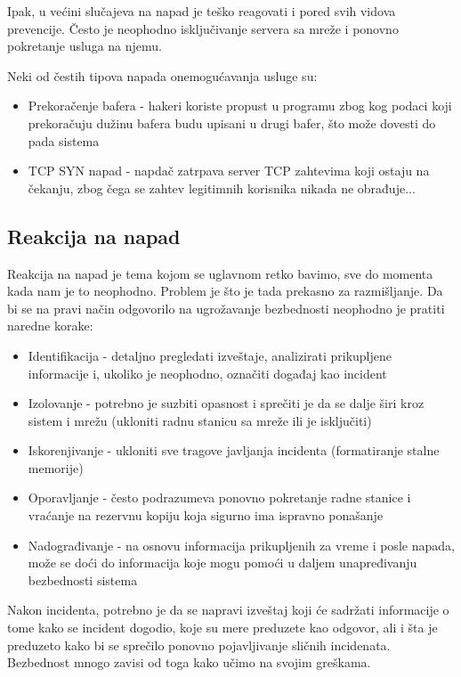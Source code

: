\documentclass[a4paper]{article}
\begin{document}
Ipak, u većini slučajeva na napad je teško reagovati i pored svih vidova prevencije. Često je neophodno isključivanje servera sa mreže i ponovno pokretanje usluga na njemu.

Neki od čestih tipova napada onemogućavanja usluge \cite{DoS} su: 
\begin{itemize}
	\item Prekoračenje bafera - hakeri koriste propust u programu zbog kog podaci koji prekoračuju dužinu bafera budu upisani u drugi bafer, što može dovesti do pada sistema
	\item TCP SYN napad - napdač zatrpava server TCP zahtevima koji ostaju na čekanju, zbog čega se zahtev legitimnih korisnika nikada ne obrađuje...
\end{itemize}

\subsection{Reakcija na napad}

Reakcija na napad \cite{RESP} je tema kojom se uglavnom retko bavimo, sve do momenta kada nam je to neophodno. Problem je što je tada prekasno za razmišljanje. Da bi se na pravi način odgovorilo na ugrožavanje bezbednosti neophodno je pratiti naredne korake:

\begin{itemize}
	\item Identifikacija - detaljno pregledati izveštaje, analizirati prikupljene informacije i, ukoliko je neophodno, označiti događaj kao incident
	\item Izolovanje - potrebno je suzbiti opasnost i sprečiti je da se dalje širi kroz sistem i mrežu (ukloniti radnu stanicu sa mreže ili je isključiti)
	\item Iskorenjivanje - ukloniti sve tragove javljanja incidenta (formatiranje stalne memorije)
	\item Oporavljanje - često podrazumeva ponovno pokretanje radne stanice i vraćanje na rezervnu kopiju koja sigurno ima ispravno ponašanje
	\item Nadograđivanje - na osnovu informacija prikupljenih za vreme i posle napada, može se doći do informacija koje mogu pomoći u daljem unapređivanju bezbednosti sistema
\end{itemize}

Nakon incidenta, potrebno je da se napravi izveštaj koji će sadržati informacije o tome kako se incident dogodio, koje su mere preduzete kao odgovor, ali i šta je preduzeto kako bi se sprečilo ponovno pojavljivanje sličnih incidenata. Bezbednost mnogo zavisi od toga kako učimo na svojim greškama.
\end{document}
